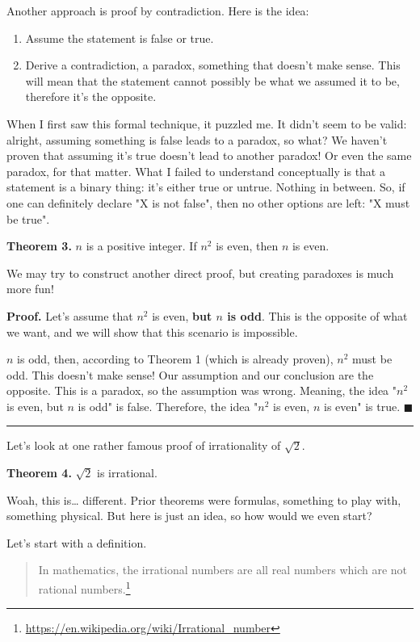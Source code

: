 \documentclass[a4paper, justified, notitlepage, sfsidenotes, notoc]{tufte-book}
\begin{document}
Another approach is proof by contradiction. Here is the idea:

\begin{enumerate}
\item Assume the statement is false or true.
\item Derive a contradiction, a paradox, something that doesn't make sense. This will mean that the statement cannot possibly be what we assumed it to be, therefore it's the opposite.
\end{enumerate}

When I first saw this formal technique, it puzzled me. It didn't seem to be valid: alright, assuming something is false leads to a paradox, so what? We haven't proven that assuming it's true doesn't lead to another paradox! Or even the same paradox, for that matter. What I failed to understand conceptually is that a statement is a binary thing: it's either true or untrue. Nothing in between. So, if one can definitely declare "X is not false", then no other options are left: "X must be true".

\textbf{Theorem 3.} \(n\) is a positive integer. If \(n^2\) is even, then \(n\) is even.

We may try to construct another direct proof, but creating paradoxes is much more fun!

\textbf{Proof.} Let's assume that \(n^2\) is even, \textbf{but \(n\) is odd}. This is the opposite of what we want, and we will show that this scenario is impossible.

\(n\) is odd, then, according to Theorem 1 (which is already proven), \(n^2\) must be odd. This doesn't make sense! Our assumption and our conclusion are the opposite. This is a paradox, so the assumption was wrong. Meaning, the idea "\(n^2\) is even, but \(n\) is odd" is false. Therefore, the idea "\(n^2\) is even, \(n\) is even" is true. \(\blacksquare\)

\noindent\rule{\textwidth}{0.5pt}

Let's look at one rather famous proof of irrationality of \(\sqrt{2}\).

\textbf{Theorem 4.} \(\sqrt{2}\) is irrational.

Woah, this is\ldots{} different. Prior theorems were formulas, something to play with, something physical. But here is just an idea, so how would we even start?

Let's start with a definition.

\begin{quote}
In mathematics, the irrational numbers are all real numbers which are not rational numbers.\footnote{\url{https://en.wikipedia.org/wiki/Irrational\_number}}
\end{quote}
\end{document}
